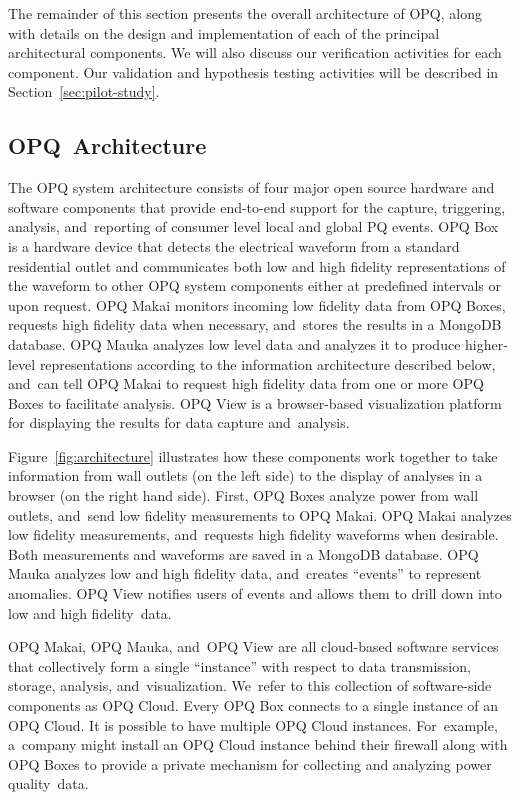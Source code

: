 \documentclass[energies,article,accept,moreauthors,pdftex]{Definitions/mdpi}
\begin{document}
The remainder of this section presents the overall architecture of OPQ, along with details on the design and implementation of each of the principal architectural components. We will also discuss our verification activities for each component. Our validation and hypothesis testing activities will be described in Section~\ref{sec:pilot-study}.

\subsection{OPQ~Architecture}

The OPQ system architecture consists of four major open source hardware and software components that provide end-to-end support for the capture, triggering, analysis, and~reporting of consumer level local and global PQ events. OPQ Box is a hardware device that detects the electrical waveform from a standard residential outlet and communicates both low and high fidelity representations of the waveform to other OPQ system components either at predefined intervals or upon request. OPQ Makai monitors incoming low fidelity data from OPQ Boxes, requests high fidelity data when necessary, and~stores the results in a MongoDB database. OPQ Mauka analyzes low level data and analyzes it to produce higher-level representations according to the information architecture described below, and~can tell OPQ Makai to request high fidelity data from one or more OPQ Boxes to facilitate analysis. OPQ View is a browser-based visualization platform for displaying the results for data capture and~analysis.



Figure~\ref{fig:architecture} illustrates how these components work together to take information from wall outlets (on the left side) to the display of analyses in a browser (on the right hand side). First, OPQ Boxes analyze power from wall outlets, and~send low fidelity measurements to OPQ Makai. OPQ Makai analyzes low fidelity measurements, and~requests high fidelity waveforms when desirable. Both measurements and waveforms are saved in a MongoDB database. OPQ Mauka analyzes low and high fidelity data, and~creates ``events'' to represent anomalies. OPQ View notifies users of events and allows them to drill down into low and high fidelity~data.

OPQ Makai, OPQ Mauka, and~OPQ View are all cloud-based software services that collectively form a single ``instance'' with respect to data transmission, storage, analysis, and~visualization. We~refer to this collection of software-side components as OPQ Cloud. Every OPQ Box connects to a single instance of an OPQ Cloud. It is possible to have multiple OPQ Cloud instances. For~example, a~company might install an OPQ Cloud instance behind their firewall along with OPQ Boxes to provide a private mechanism for collecting and analyzing power quality~data.
\end{document}

